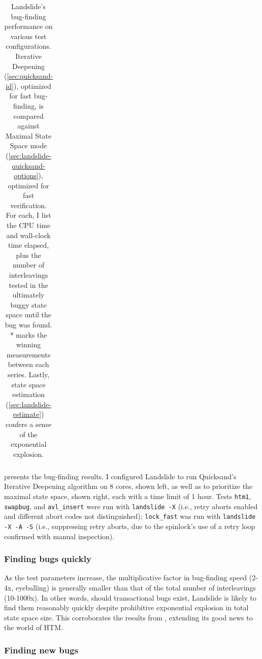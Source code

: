 \begin{table}[t]
\begin{center}
\begin{tabular}{cc||r|r|r||r|r|r|r}
	\end{tabular}
	\end{center}
	\caption[Landslide's bug-finding performance on various test configurations.]
		{Landslide's bug-finding performance on various test configurations.
		Iterative Deepening (\cref{sec:quicksand-id}), optimized for fast bug-finding,
		is compared against Maximal State Space mode (\cref{sec:landslide-quicksand-options}),
		optimized for fast verification.
		For each, I list the CPU time and wall-clock time elapsed,
		plus the number of interleavings tested in the ultimately buggy state space
		until the bug was found.
		* marks the winning measurements between each series.
		Lastly, state space estimation (\cref{sec:landslide-estimate})
		confers a sense of the exponential explosion.
	}
	\label{tab:tm-buges}
\end{table}

presents the bug-finding results.
I configured Landslide to run Quicksand's Iterative Deepening algorithm on 8 cores, %
shown left,
as well as to prioritize the maximal state space, %
shown right,
each with a time limit of 1 hour.
Tests {\tt htm1}, {\tt swapbug}, and {\tt avl\_insert} were run with {\tt landslide -X}
(i.e., retry aborts enabled and different abort codes not distinguished);
{\tt lock\_fast} was run with {\tt landslide -X -A -S}
(i.e., suppressing retry aborts, due to the spinlock's use of a retry loop confirmed with manual inspection).

\subsubsection{Finding bugs quickly}

As the test parameters increase,
the multiplicative factor in bug-finding speed (2-4x, eyeballing) is generally smaller
than that of the total number of interleavings (10-1000x).
In other words,
should transactional bugs exist,
Landslide is likely to find them reasonably quickly %
despite prohibitive exponential explosion in total state space size.
This corroborates the results from ,
extending its good news to the world of HTM.

\subsubsection{Finding new bugs}


